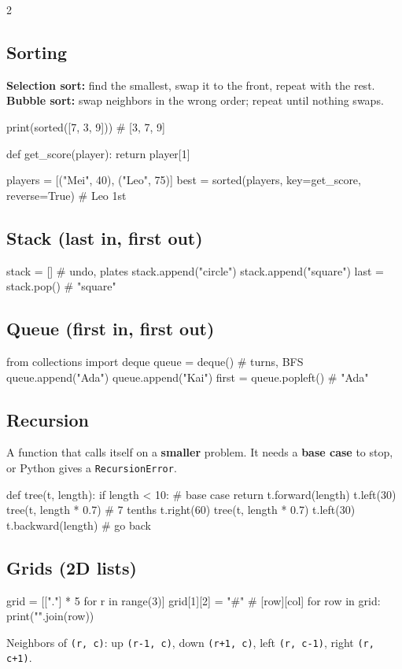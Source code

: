 \documentclass[level=3]{kidscode}
\begin{document}
\begin{multicols}{2}
\subsection{Sorting}
\textbf{Selection sort:} find the smallest, swap it to the front, repeat with the rest.
\textbf{Bubble sort:} swap neighbors in the wrong order; repeat until nothing swaps.
\begin{sheetcode}
print(sorted([7, 3, 9]))  # [3, 7, 9]

def get_score(player):
    return player[1]

players = [("Mei", 40), ("Leo", 75)]
best = sorted(players, key=get_score,
              reverse=True)  # Leo 1st
\end{sheetcode}

\subsection{Stack (last in, first out)}
\begin{sheetcode}
stack = []            # undo, plates
stack.append("circle")
stack.append("square")
last = stack.pop()    # "square"
\end{sheetcode}

\subsection{Queue (first in, first out)}
\begin{sheetcode}
from collections import deque
queue = deque()       # turns, BFS
queue.append("Ada")
queue.append("Kai")
first = queue.popleft()   # "Ada"
\end{sheetcode}

\subsection{Recursion}
A function that calls itself on a \textbf{smaller} problem. It needs a \textbf{base case} to stop,
or Python gives a \texttt{RecursionError}.
\begin{sheetcode}
def tree(t, length):
    if length < 10:       # base case
        return
    t.forward(length)
    t.left(30)
    tree(t, length * 0.7) # 7 tenths
    t.right(60)
    tree(t, length * 0.7)
    t.left(30)
    t.backward(length)    # go back
\end{sheetcode}

\subsection{Grids (2D lists)}
\begin{sheetcode}
grid = [["."] * 5 for r in range(3)]
grid[1][2] = "#"          # [row][col]
for row in grid:
    print("".join(row))
\end{sheetcode}
Neighbors of \texttt{(r, c)}: up \texttt{(r-1, c)}, down \texttt{(r+1, c)}, left
\texttt{(r, c-1)}, right \texttt{(r, c+1)}.


\end{multicols}
\end{document}
